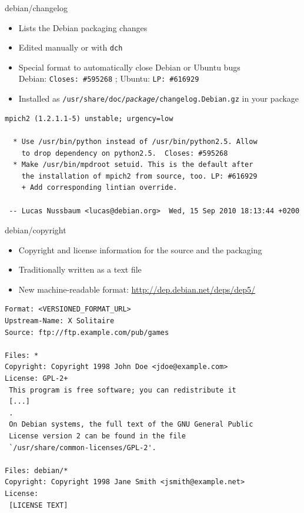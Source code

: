 \documentclass[10pt,final]{beamer}
\begin{document}
\begin{frame}[fragile]{debian/changelog}
	\begin{itemize}
		\item Lists the Debian packaging changes
		\item Edited manually or with \texttt{dch}
		\item Special format to automatically close Debian or Ubuntu bugs\\
			Debian: \texttt{Closes:~\#595268} ; Ubuntu: \texttt{LP:~\#616929}
		\item Installed as \texttt{/usr/share/doc/\textit{package}/changelog.Debian.gz} in your package
	\end{itemize}
\begin{lstlisting}[basicstyle=\ttfamily\footnotesize]
mpich2 (1.2.1.1-5) unstable; urgency=low

  * Use /usr/bin/python instead of /usr/bin/python2.5. Allow
    to drop dependency on python2.5.  Closes: #595268
  * Make /usr/bin/mpdroot setuid. This is the default after
    the installation of mpich2 from source, too. LP: #616929
    + Add corresponding lintian override.

 -- Lucas Nussbaum <lucas@debian.org>  Wed, 15 Sep 2010 18:13:44 +0200
\end{lstlisting}
\end{frame}

\begin{frame}[fragile]{debian/copyright}
	\hbr
	\begin{itemize}
		\item Copyright and license information for the source and the packaging
		\item Traditionally written as a text file
		\item New machine-readable format: \url{http://dep.debian.net/deps/dep5/}
	\end{itemize}
\begin{lstlisting}[basicstyle=\ttfamily\footnotesize]
Format: <VERSIONED_FORMAT_URL>
Upstream-Name: X Solitaire
Source: ftp://ftp.example.com/pub/games

Files: *
Copyright: Copyright 1998 John Doe <jdoe@example.com>
License: GPL-2+
 This program is free software; you can redistribute it
 [...]
 .
 On Debian systems, the full text of the GNU General Public
 License version 2 can be found in the file
 `/usr/share/common-licenses/GPL-2'.

Files: debian/*
Copyright: Copyright 1998 Jane Smith <jsmith@example.net>
License:
 [LICENSE TEXT]
\end{lstlisting}
\end{frame}
\end{document}
